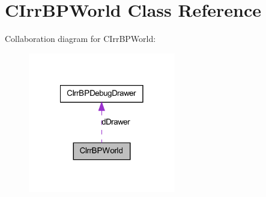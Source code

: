 \hypertarget{class_c_irr_b_p_world}{
\section{CIrrBPWorld Class Reference}
\label{class_c_irr_b_p_world}
}


Collaboration diagram for CIrrBPWorld:\nopagebreak
\begin{figure}[H]
\begin{center}
\leavevmode
\includegraphics[width=182pt]{class_c_irr_b_p_world__coll__graph}
\end{center}
\end{figure}
